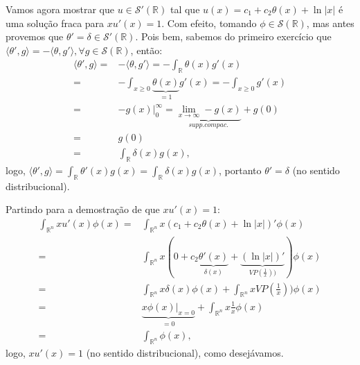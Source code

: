 \documentclass{article}
\begin{document}
\begin{enumerate}
		Vamos agora mostrar que $u \in \mathcal{S}'(\mathbb{R})$ tal que $u(x) = c_{1} + c_{2}\theta(x) + \ln|x|$ é uma solução fraca para $xu'(x) = 1$. Com efeito, tomando $\phi \in \mathcal{S}(\mathbb{R})$, mas antes provemos que $\theta' = \delta \in \mathcal{S}'(\mathbb{R})$. Pois bem, sabemos do primeiro exercício que $\langle \theta',g \rangle = - \langle \theta,g' \rangle, \forall g \in \mathcal{S}(\mathbb{R})$, então:
		$$
		\begin{aligned}
		\langle \theta',g \rangle = & - \langle \theta,g' \rangle = -\int_{\mathbb{R}} \theta(x)g'(x)
		\\
		= & -\int_{x \geq 0} \underbrace{ \theta(x) }_{=1} g'(x)= -\int_{x \geq 0} g'(x)
		\\
		= & -g(x) \Big|^{\infty}_{0} = \underbrace{ \lim_{x \to \infty}-g(x) }_{supp. compac.} + g(0)
		\\
		= & g(0)
		\\
		= & \int_{\mathbb{R}} \delta(x)g(x),
		\end{aligned}
		$$
		logo, $\langle \theta',g \rangle = \int_{\mathbb{R}} \theta'(x)g(x) = \int_{\mathbb{R}} \delta(x)g(x)$, portanto $\theta' = \delta$ (no sentido distribucional).
		
		Partindo para a demostração de que $xu'(x) = 1$:
		$$
		\begin{aligned}
		\int_{\mathbb{R}^{n}} xu'(x)\phi(x) = & \int_{\mathbb{R}^{n}} x(c_{1} + c_{2}\theta(x) + \ln|x|)'\phi(x)
		\\
		= & \int_{\mathbb{R}^{n}} x(0 + c_{2} \underbrace{ \theta'(x) }_{\delta(x)} + \underbrace{ (\ln|x|)' }_{VP(\frac{1}{x}))} ) \phi(x)
		\\
		= & \int_{\mathbb{R}^{n}} x \delta(x)\phi(x) + \int_{\mathbb{R}^{n}}  xVP(\frac{1}{x}))\phi(x)
		\\
		= & \underbrace{ x \phi(x)\Big|_{x=0} }_{=0} + \int_{\mathbb{R}^{n}}  x\frac{1}{x}\phi(x)
		\\
		= & \int_{\mathbb{R}^{n}} \phi(x),
		\end{aligned}
		$$
		logo, $xu'(x) = 1$ (no sentido distribucional), como desejávamos.
			
	\end{enumerate}
	
	
\end{document}
